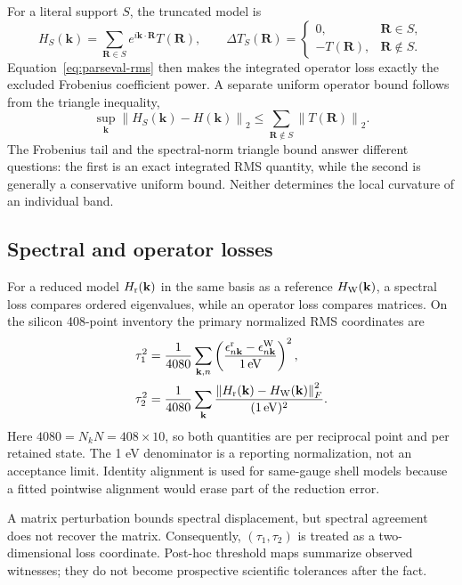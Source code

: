 \documentclass[11pt]{article}
\theoremstyle{definition}
\newcommand{\norm}[1]{\left\lVert#1\right\rVert}
\newcommand{\kvec}{\mathbf k}
\newcommand{\Rvec}{\mathbf R}
\begin{document}
For a literal support $S$, the truncated model is
\begin{equation}
 H_S(\kvec)=\sum_{\Rvec\in S}e^{i\kvec\cdot\Rvec}T(\Rvec),
 \qquad
 \Delta T_S(\Rvec)=
 \begin{cases}
 0,&\Rvec\in S,\\
 -T(\Rvec),&\Rvec\notin S.
 \end{cases}
 \label{eq:literal-truncation}
\end{equation}
Equation~\eqref{eq:parseval-rms} then makes the integrated operator loss exactly the
excluded Frobenius coefficient power.  A separate uniform operator bound follows from
the triangle inequality,
\begin{equation}
 \sup_{\kvec}\norm{H_S(\kvec)-H(\kvec)}_2
 \leq \sum_{\Rvec\notin S}\norm{T(\Rvec)}_2.
 \label{eq:triangle-tail-bound}
\end{equation}
The Frobenius tail and the spectral-norm triangle bound answer different questions: the
first is an exact integrated RMS quantity, while the second is generally a conservative
uniform bound.  Neither determines the local curvature of an individual band.

\subsection{Spectral and operator losses}

For a reduced model $H_{\rm r}(\kvec)$ in the same basis as a reference
$H_{\rm W}(\kvec)$, a spectral loss compares ordered eigenvalues, while an operator loss
compares matrices.  On the silicon 408-point inventory the primary normalized RMS
coordinates are
\begin{align}
 \tau_1^2
 &=\frac{1}{4080}\sum_{\kvec,n}
 \left(\frac{\epsilon^{\rm r}_{n\kvec}-\epsilon^{\rm W}_{n\kvec}}
 {1\,{\rm eV}}\right)^2,\label{eq:tau1-main}\\
 \tau_2^2
 &=\frac{1}{4080}\sum_{\kvec}
 \frac{\norm{H_{\rm r}(\kvec)-H_{\rm W}(\kvec)}_F^2}
 {(1\,{\rm eV})^2}.
 \label{eq:tau2-main}
\end{align}
Here $4080=N_kN=408\times10$, so both quantities are per reciprocal point and per
retained state.  The 1 eV denominator is a reporting normalization, not an acceptance
limit.  Identity alignment is used for same-gauge shell models because a fitted
pointwise alignment would erase part of the reduction error.

A matrix perturbation bounds spectral displacement, but spectral agreement does not
recover the matrix.  Consequently, $(\tau_1,\tau_2)$ is treated as a two-dimensional
loss coordinate.  Post-hoc threshold maps summarize observed witnesses; they do not
become prospective scientific tolerances after the fact.
\end{document}
